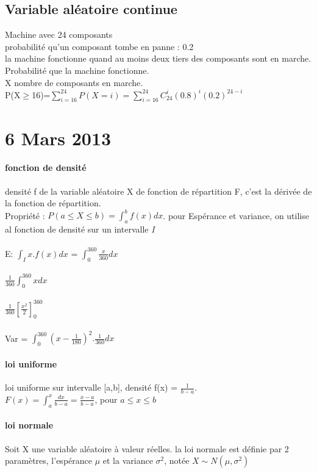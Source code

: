 \documentclass{article}
\begin{document}
\subsection{Variable aléatoire continue} 
Machine avec 24 composants \\
probabilité qu'un composant tombe en panne : 0.2\\
la machine fonctionne quand au moins deux tiers des composants sont en marche.\\
Probabilité que la machine fonctionne.\\X nombre de composants en marche.\\P(X$\geq$16)=$\sum_{i=16}^{24} P(X=i) = \sum_{i=16}^{24} C_{24}^i (0.8)^i (0.2)^{24-i}$

\section{6 Mars 2013}
\paragraph{fonction de densité} densité f de la variable aléatoire X de fonction de répartition F, c'est la dérivée de la fonction de répartition.\\
Propriété : $ P(a\leq X \leq b) = \int_a^b f(x)dx$. pour Espérance et variance, on utilise al fonction de densité sur un intervalle \textit{I}\\\\
E:  $\int_I x.f(x)dx $ = $\int_0^{360} \frac{x}{360} dx$\\\\
$\frac{1}{360} \int_0^{360} xdx$\\\\ 
$\frac{1}{360} [\frac{x^2}{2}]_0^{360}$ \\\\
Var = $\int_0^{360} (x-\frac{1}{180})^2 . \frac{1}{360}dx$
\paragraph{loi uniforme} loi uniforme sur intervalle [a,b], densité f(x) = $\frac{1}{b-a}$.\\$F(x) = \int_a^x \frac{dx}{b-a} = \frac{x-a}{b-a}$, pour $a\leq x\leq b$

\paragraph{loi normale} Soit X une variable aléatoire à valeur réelles. la loi normale est définie par 2 paramètres, l'espérance $\mu$ et la variance $\sigma^2$, notée $ X \sim N(\mu,\sigma^2)$
\end{document}
